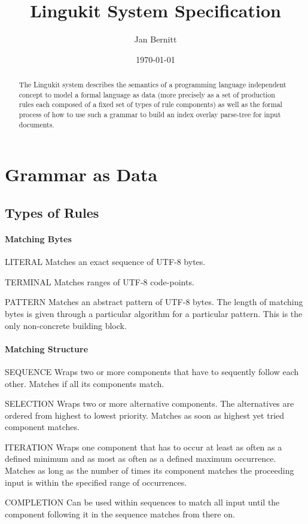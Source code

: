 \documentclass[10pt,a4paper]{article}
\begin{document}
\title{Lingukit System Specification}
\author{Jan Bernitt}
\date{\today}
\maketitle

\begin{abstract}
\noindent The Lingukit system describes the semantics of a programming language independent concept to model a formal language as data (more precisely as a set of production rules each composed of a fixed set of types of rule components) as well as the formal process of how to use such a grammar to build an index overlay parse-tree for input documents.
\end{abstract}
\section{Grammar as Data}
\subsection{Types of Rules}
\paragraph{Matching Bytes}
\begin{rulelist}
\item[LITERAL] Matches an exact sequence of UTF-8 bytes.
\item[TERMINAL] Matches ranges of UTF-8 code-points.
\item[PATTERN] Matches an abstract pattern of UTF-8 bytes. The length of matching bytes is given through a particular algorithm for a particular pattern. This is the only non-concrete building block.
\end{rulelist}

\paragraph{Matching Structure}
\begin{rulelist}
\item[SEQUENCE] Wraps two or more components that have to sequently follow each other. Matches if all its components match.
\item[SELECTION] Wraps two or more alternative components. The alternatives are ordered from highest to lowest priority. Matches as soon as highest yet tried component matches.
\item[ITERATION] Wraps one component that has to occur at least as often as a defined minimum and as most as often as a defined maximum occurrence. Matches as long as the number of times its component matches the proceeding input is within the specified range of occurrences.
\item[COMPLETION] Can be used within sequences to match all input until the component following it in the sequence matches from there on. 
\end{rulelist}
\end{document}
